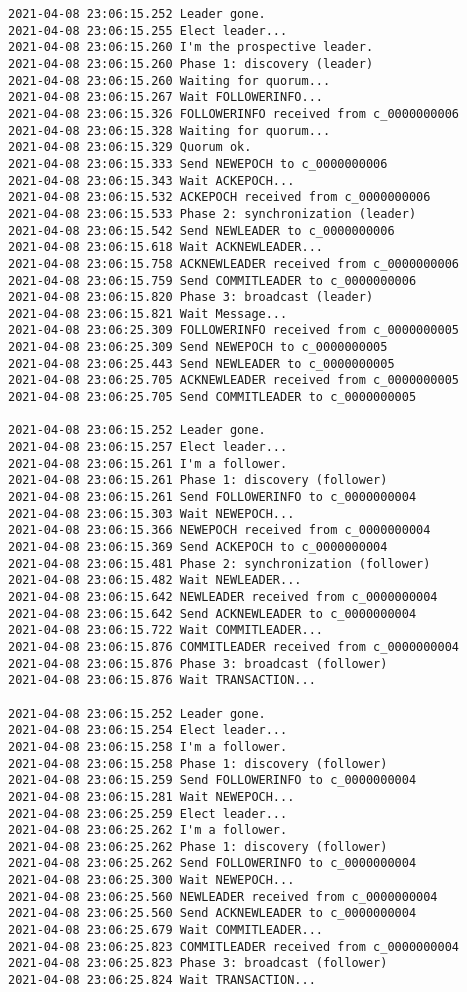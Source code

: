\begin{verbatim}
2021-04-08 23:06:15.252 Leader gone.
2021-04-08 23:06:15.255 Elect leader...
2021-04-08 23:06:15.260 I'm the prospective leader.
2021-04-08 23:06:15.260 Phase 1: discovery (leader)
2021-04-08 23:06:15.260 Waiting for quorum...
2021-04-08 23:06:15.267 Wait FOLLOWERINFO...
2021-04-08 23:06:15.326 FOLLOWERINFO received from c_0000000006
2021-04-08 23:06:15.328 Waiting for quorum...
2021-04-08 23:06:15.329 Quorum ok.
2021-04-08 23:06:15.333 Send NEWEPOCH to c_0000000006
2021-04-08 23:06:15.343 Wait ACKEPOCH...
2021-04-08 23:06:15.532 ACKEPOCH received from c_0000000006
2021-04-08 23:06:15.533 Phase 2: synchronization (leader)
2021-04-08 23:06:15.542 Send NEWLEADER to c_0000000006
2021-04-08 23:06:15.618 Wait ACKNEWLEADER...
2021-04-08 23:06:15.758 ACKNEWLEADER received from c_0000000006
2021-04-08 23:06:15.759 Send COMMITLEADER to c_0000000006
2021-04-08 23:06:15.820 Phase 3: broadcast (leader)
2021-04-08 23:06:15.821 Wait Message...
2021-04-08 23:06:25.309 FOLLOWERINFO received from c_0000000005
2021-04-08 23:06:25.309 Send NEWEPOCH to c_0000000005
2021-04-08 23:06:25.443 Send NEWLEADER to c_0000000005
2021-04-08 23:06:25.705 ACKNEWLEADER received from c_0000000005
2021-04-08 23:06:25.705 Send COMMITLEADER to c_0000000005

2021-04-08 23:06:15.252 Leader gone.
2021-04-08 23:06:15.257 Elect leader...
2021-04-08 23:06:15.261 I'm a follower.
2021-04-08 23:06:15.261 Phase 1: discovery (follower)
2021-04-08 23:06:15.261 Send FOLLOWERINFO to c_0000000004
2021-04-08 23:06:15.303 Wait NEWEPOCH...
2021-04-08 23:06:15.366 NEWEPOCH received from c_0000000004
2021-04-08 23:06:15.369 Send ACKEPOCH to c_0000000004
2021-04-08 23:06:15.481 Phase 2: synchronization (follower)
2021-04-08 23:06:15.482 Wait NEWLEADER...
2021-04-08 23:06:15.642 NEWLEADER received from c_0000000004
2021-04-08 23:06:15.642 Send ACKNEWLEADER to c_0000000004
2021-04-08 23:06:15.722 Wait COMMITLEADER...
2021-04-08 23:06:15.876 COMMITLEADER received from c_0000000004
2021-04-08 23:06:15.876 Phase 3: broadcast (follower)
2021-04-08 23:06:15.876 Wait TRANSACTION...

2021-04-08 23:06:15.252 Leader gone.
2021-04-08 23:06:15.254 Elect leader...
2021-04-08 23:06:15.258 I'm a follower.
2021-04-08 23:06:15.258 Phase 1: discovery (follower)
2021-04-08 23:06:15.259 Send FOLLOWERINFO to c_0000000004
2021-04-08 23:06:15.281 Wait NEWEPOCH...
2021-04-08 23:06:25.259 Elect leader...
2021-04-08 23:06:25.262 I'm a follower.
2021-04-08 23:06:25.262 Phase 1: discovery (follower)
2021-04-08 23:06:25.262 Send FOLLOWERINFO to c_0000000004
2021-04-08 23:06:25.300 Wait NEWEPOCH...
2021-04-08 23:06:25.560 NEWLEADER received from c_0000000004
2021-04-08 23:06:25.560 Send ACKNEWLEADER to c_0000000004
2021-04-08 23:06:25.679 Wait COMMITLEADER...
2021-04-08 23:06:25.823 COMMITLEADER received from c_0000000004
2021-04-08 23:06:25.823 Phase 3: broadcast (follower)
2021-04-08 23:06:25.824 Wait TRANSACTION...
\end{verbatim}

